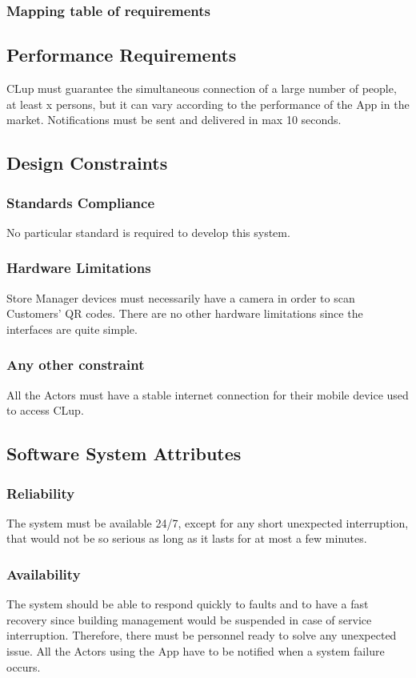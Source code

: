 \documentclass{article}
\begin{document}
	\subsubsection{Mapping table of requirements}
	\subsection{Performance Requirements}
	CLup must guarantee the simultaneous connection of a large number of people, at least x persons, but it can vary according to the performance of the App in the market. Notifications must be sent and delivered in max 10 seconds.
	\subsection{Design Constraints}
	\subsubsection{Standards Compliance}
	No particular standard is required to develop this system.
	\subsubsection{Hardware Limitations}
	Store Manager devices must necessarily have a camera in order to scan Customers’ QR codes. There are no other hardware limitations since the interfaces are quite simple.
	\subsubsection{Any other constraint}
	All the Actors must have a stable internet connection for their mobile device used to access CLup.
	\subsection{Software System Attributes}
         \subsubsection{Reliability}
         The system must be available 24/7, except for any short unexpected interruption, that would not be so serious as long as it lasts for at most a few minutes.
         \subsubsection{Availability}
         The system should be able to respond quickly to faults and to have a fast recovery since building management would be suspended in case of service interruption. Therefore, there must be personnel ready to solve any unexpected issue. All the Actors using the App have to be notified when a system failure occurs.
\end{document}
